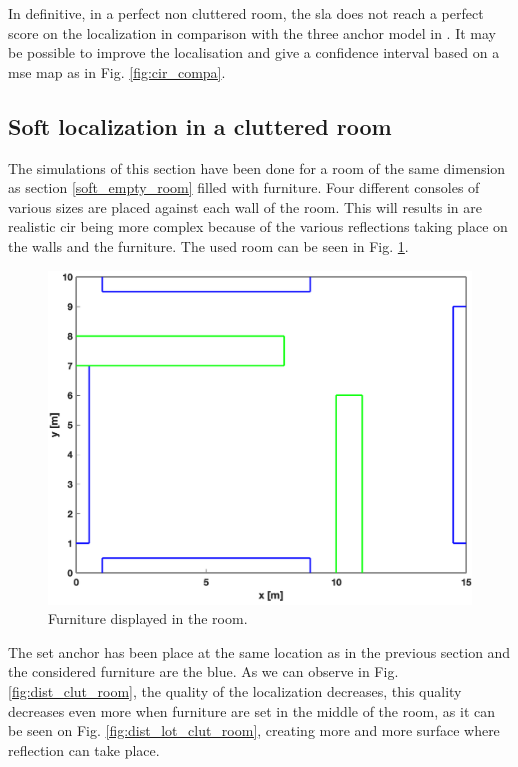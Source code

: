 In definitive, in a perfect non cluttered room, the \gls{sla} does not reach a perfect score on the localization in comparison with the three anchor model in \cite{hannotier2019indoor}. It may be possible to improve the localisation and give a confidence interval based on a \gls{mse} map as in Fig. \ref{fig:cir_compa}.

\subsection{Soft localization in a cluttered room}
\label{simu_soft_clut}
The simulations of this section have been done for a room of the same dimension as section \ref{soft_empty_room} filled with furniture. Four different consoles of various sizes are placed against each wall of the room. This will results in are realistic \gls{cir} being more complex because of the various reflections taking place on the walls and the furniture. The used room can be seen in Fig. \ref{fig:room_cluttered}.

\begin{figure}[H]
\centering
\includegraphics[width=.6\linewidth]{Images/room_furniture.png}
\caption{Furniture displayed in the room. \label{fig:room_cluttered}}
\end{figure}


The set anchor has been place at the same location as in the previous section and the considered furniture are the blue. As we can observe in Fig. \ref{fig:dist_clut_room}, the quality of the localization decreases, this quality decreases even more when furniture are set in the middle of the room, as it can be seen on Fig. \ref{fig:dist_lot_clut_room}, creating more and more surface where reflection can take place.

